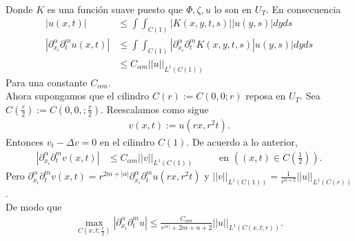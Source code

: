 \begin{homeworkProblem}
\begin{solucion}
\begin{align*}
    \end{align*}
    Donde $K$ es una función suave puesto que $\Phi, \zeta, u $ lo son en $U_{T}$. En consecuencia 
    \begin{align*}
      |u(x,t)| &\leq \int \int_{C(1)} |K(x,y,t,s)||u(y,s)|dyds\\
      |\partial_{x_{i}} ^{\alpha}\partial_{t}^{m}u(x,t)| &\leq \int \int_{C(1)} |\partial_{x_{i}} ^{\alpha}\partial_{t}^{m}K(x,y,t,s)|u(y,s)|dyds\\ 
      &\leq C_{\alpha m}||u||_{L^{1}(C(1))}
    \end{align*}
    Para una constante $C_{\alpha m}$.\\ 
    Ahora supongamos que el cilindro $C(r) := C(0,0;r)$ reposa en $U_{T}$. Sea $C(\frac{r}{2}):= C(0,0,;\frac{r}{2})$. Reescalamos como sigue
    \begin{align*}
      v(x,t) := u(rx,r^{2}t).
    \end{align*}
    Entonces $v_{t} - \Delta v = 0$ en el cilindro $C(1)$. De acuerdo a lo anterior,
    \begin{align*}
      |\partial_{x_{i}} ^{\alpha}\partial_{t}^{m}v(x,t)| &\leq C_{\alpha m}||v||_{L^{1}(C(1))} \hspace{1cm} \text{ en } ((x,t) \in C(\frac{1}{2})). 
    \end{align*}
    Pero $\partial_{x_{i}} ^{\alpha}\partial_{t}^{m}v(x,t) = r^{2m+|\alpha|} \partial_{x_{i}} ^{\alpha}\partial_{t}^{m}u(rx,r^{2}t)$ y $||v||_{L^{1}(C(1))} = \frac{1}{r^{n+2}}||u||_{L^{1}(C(r))}$.\\
    De modo que 
    \begin{align*}
      \max_{C(x,t;\frac{r}{2})}|\partial_{x_{i}} ^{\alpha}\partial_{t}^{m}u| \leq \frac{C_{\alpha m}}{r^{|\alpha|}+2m+n+2}||u||_{L^{1}(C(x,t;r))}. 
    \end{align*}    
    \demostrado
  \end{solucion}  
\end{homeworkProblem}
